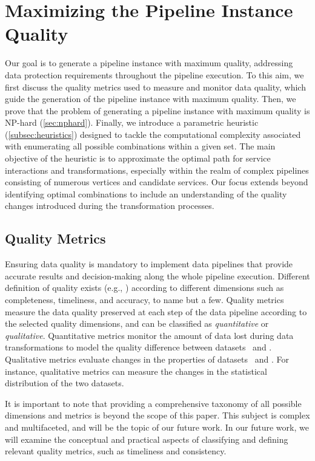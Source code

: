 \section{Maximizing the Pipeline Instance Quality}\label{sec:heuristics}
Our goal is to generate a pipeline instance with maximum quality, addressing data protection requirements throughout the pipeline execution. To this aim, we first discuss the quality metrics used to measure and monitor data quality, which guide the generation of the pipeline instance with maximum quality. Then, we prove that the problem of generating a pipeline instance with maximum quality is NP-hard (\cref{sec:nphard}). Finally, we introduce a parametric heuristic (\cref{subsec:heuristics}) designed to tackle the computational complexity associated with enumerating all possible combinations within a given set. The main objective of the heuristic is to approximate the optimal path for service interactions and transformations, especially within the realm of complex pipelines consisting of numerous vertices and candidate services. Our focus extends beyond identifying optimal combinations to include an understanding of the quality changes introduced during the transformation processes.

\subsection{Quality Metrics}\label{subsec:metrics}
Ensuring data quality is mandatory to implement data pipelines that provide accurate results and decision-making along the whole pipeline execution.
{\color{OurColor} Different definition of quality exists (e.g., \cite{Wang2023,surveyquality}) according to different dimensions such as completeness, timeliness, and accuracy, to name but a few. Quality metrics measure the data quality preserved at each step of the data pipeline according to the selected quality dimensions, and can be classified as \emph{quantitative} or \emph{qualitative}.}
Quantitative metrics monitor the amount of data lost during data transformations to model the quality difference between datasets \origdataset\ and \transdataset.
Qualitative metrics evaluate changes in the properties of datasets \origdataset\ and \transdataset. For instance, qualitative metrics can measure the changes in the statistical distribution of the two datasets.

{\color{OurColor2}
It is important to note that providing a comprehensive taxonomy of all possible dimensions and metrics is beyond the scope of this paper. This subject is complex and multifaceted, and will be the topic of our future work. In our future work, we will examine the conceptual and practical aspects of classifying and defining relevant quality metrics, such as timeliness and consistency.
                  }

